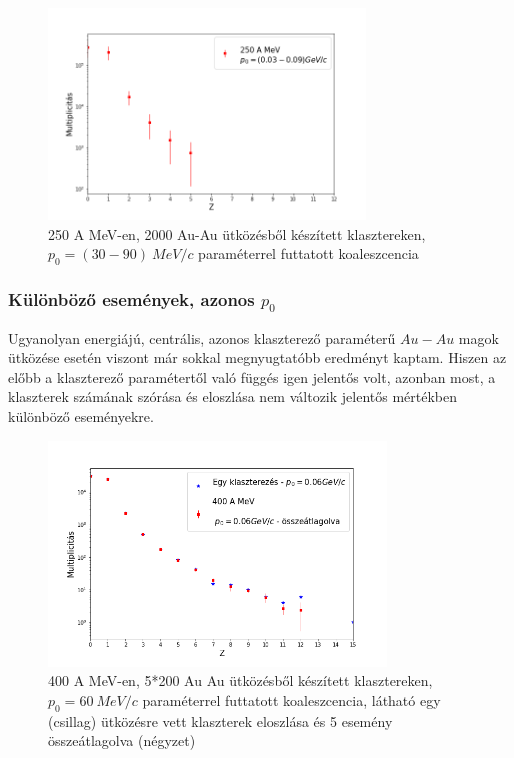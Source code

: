 \documentclass[a4paper,12pt]{article}
\begin{document}
\vspace{5mm}

\begin{figure}[!htb]
\centering
\includegraphics[width=0.75\textwidth]{./p0valtozik_klaszterek.png}
\caption{250 A MeV-en, 2000 Au-Au ütközésből készített klasztereken, $p_{0} = (30 - 90) ~MeV/c$ paraméterrel futtatott koaleszcencia}
\end{figure}

\vspace{5mm}

\subsubsection{ Különböző események, azonos $p_{0}$}

\vspace{5mm}

\par Ugyanolyan energiájú, centrális, azonos klaszterező paraméterű $Au-Au$ magok ütközése esetén viszont már sokkal megnyugtatóbb eredményt kaptam. Hiszen az előbb a klaszterező paramétertől való függés igen jelentős volt, azonban most, a klaszterek számának szórása és eloszlása nem változik jelentős mértékben különböző eseményekre. 

\vspace{5mm}

\begin{figure}[!htb]
\centering
\includegraphics[width=0.8\textwidth]{./p0allando_kulonbozoRandom.png}
\caption{400 A MeV-en, 5*200 Au Au ütközésből készített klasztereken, $p_{0} = 60 ~MeV/c$ paraméterrel futtatott koaleszcencia, látható egy (csillag) ütközésre vett klaszterek eloszlása és 5 esemény összeátlagolva (négyzet)}
\end{figure}
\end{document}
